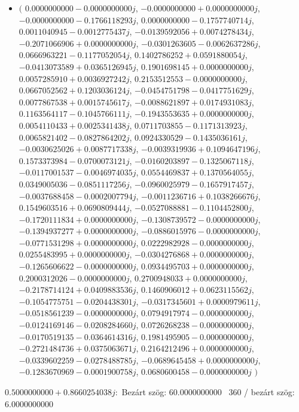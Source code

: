 \documentclass[14pt,a4paper]{article}
\begin{document}
\begin{itemize}
\item
$\big($
$0.0000000000-0.0000000000j$, $-0.0000000000+0.0000000000j$, $-0.0000000000-0.1766118293j$, $0.0000000000-0.1757740714j$, $0.0011040945-0.0012775437j$, $-0.0139592056+0.0074278434j$, $-0.2071066906+0.0000000000j$, $-0.0301263605-0.0062637286j$, $0.0666963221-0.1177052054j$, $0.1402786252+0.0591880054j$, $-0.0413073589+0.0365126945j$, $0.1901698145+0.0000000000j$, $0.0057285910+0.0036927242j$, $0.2153512553-0.0000000000j$, $0.0667052562+0.1203036124j$, $-0.0454751798-0.0417751629j$, $0.0077867538+0.0015745617j$, $-0.0088621897+0.0174931083j$, $0.1163564117-0.1045766111j$, $-0.1943553635+0.0000000000j$, $0.0054110433+0.0025341438j$, $0.0711703855-0.1171313923j$, $0.0065821402-0.0827864202j$, $0.0924330529-0.1435036161j$, $-0.0030625026+0.0087717338j$, $-0.0039319936+0.1094647196j$, $0.1573373984-0.0700073121j$, $-0.0160203897-0.1325067118j$, $-0.0117001537-0.0046974035j$, $0.0554469837+0.1370564055j$, $0.0349005036-0.0851117256j$, $-0.0960025979-0.1657917457j$, $-0.0037688458-0.0002007794j$, $-0.0011236716+0.1038266676j$, $0.1549603516+0.0690809444j$, $-0.0527088881-0.1104452800j$, $-0.1720111834+0.0000000000j$, $-0.1308739572-0.0000000000j$, $-0.1394937277+0.0000000000j$, $-0.0886015976-0.0000000000j$, $-0.0771531298+0.0000000000j$, $0.0222982928-0.0000000000j$, $0.0255483995+0.0000000000j$, $-0.0304276868+0.0000000000j$, $-0.1265606622-0.0000000000j$, $0.0934495703+0.0000000000j$, $0.2000312026-0.0000000000j$, $0.2700948033+0.0000000000j$, $-0.2178714124+0.0409883536j$, $0.1460906012+0.0623115562j$, $-0.1054775751-0.0204438301j$, $-0.0317345601+0.0000979611j$, $-0.0518561239-0.0000000000j$, $0.0794917974-0.0000000000j$, $-0.0124169146-0.0208284660j$, $0.0726268238-0.0000000000j$, $-0.0170519135-0.0364614316j$, $0.1981495905-0.0000000000j$, $-0.2721484736+0.0375063671j$, $0.2164212496+0.0000000000j$, $-0.0339602259-0.0278488785j$, $-0.0689645458+0.0000000000j$, $-0.1283670969-0.0001900758j$, $0.0680600458-0.0000000000j$
$\big)$
\end{itemize}
$0.5000000000+0.8660254038j$:\
Bezárt szög: $60.0000000000$ \
360 / bezárt szög: $6.0000000000$\
\end{document}
